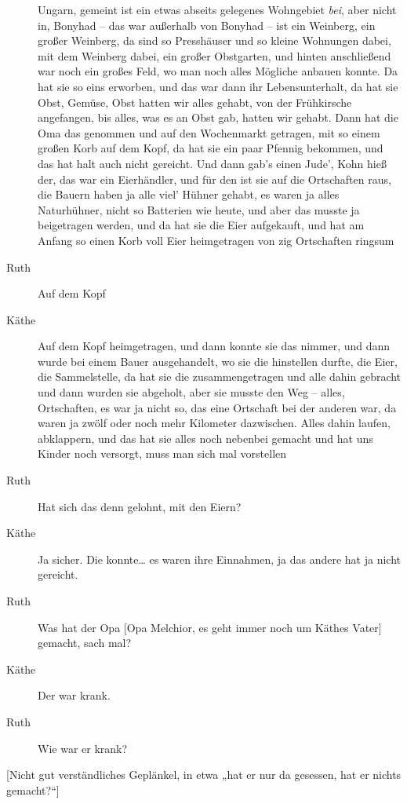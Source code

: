 \documentclass[ngerman,]{article}
\begin{document}
\begin{multicols}{3}
\begin{description}
{  Ungarn, gemeint ist ein etwas abseits gelegenes Wohngebiet \emph{bei},
  aber nicht in, Bonyhad} – das war außerhalb von Bonyhad – ist ein
Weinberg, ein großer Weinberg, da sind so Presshäuser und so kleine
Wohnungen dabei, mit dem Weinberg dabei, ein großer Obstgarten, und
hinten anschließend war noch ein großes Feld, wo man noch alles Mögliche
anbauen konnte. Da hat sie so eins erworben, und das war dann ihr
Lebensunterhalt, da hat sie Obst, Gemüse, Obst hatten wir alles gehabt,
von der Frühkirsche angefangen, bis alles, was es an Obst gab, hatten
wir gehabt. Dann hat die Oma das genommen und auf den Wochenmarkt
getragen, mit so einem großen Korb auf dem Kopf, da hat sie ein paar
Pfennig bekommen, und das hat halt auch nicht gereicht. Und dann gab's
einen Jude', Kohn hieß der, das war ein Eierhändler, und für den ist sie
auf die Ortschaften raus, die Bauern haben ja alle viel' Hühner gehabt,
es waren ja alles Naturhühner, nicht so Batterien wie heute, und aber
das musste ja beigetragen werden, und da hat sie die Eier aufgekauft,
und hat am Anfang so einen Korb voll Eier heimgetragen von zig
Ortschaften ringsum
\item[Ruth]
Auf dem Kopf
\item[Käthe]
Auf dem Kopf heimgetragen, und dann konnte sie das nimmer, und dann
wurde bei einem Bauer ausgehandelt, wo sie die hinstellen durfte, die
Eier, die Sammelstelle, da hat sie die zusammengetragen und alle dahin
gebracht und dann wurden sie abgeholt, aber sie musste den Weg – alles,
Ortschaften, es war ja nicht so, das eine Ortschaft bei der anderen war,
da waren ja zwölf oder noch mehr Kilometer dazwischen. Alles dahin
laufen, abklappern, und das hat sie alles noch nebenbei gemacht und hat
uns Kinder noch versorgt, muss man sich mal vorstellen
\item[Ruth]
Hat sich das denn gelohnt, mit den Eiern?
\item[Käthe]
Ja sicher. Die konnte\ldots{} es waren ihre Einnahmen, ja das andere hat
ja nicht gereicht.
\item[Ruth]
Was hat der Opa {[}Opa Melchior, es geht immer noch um Käthes Vater{]}
gemacht, sach mal?
\item[Käthe]
Der war krank.
\item[Ruth]
Wie war er krank?
\end{description}

{[}Nicht gut verständliches Geplänkel, in etwa „hat er nur da gesessen,
hat er nichts gemacht?“{]}


\end{multicols}
\end{document}
